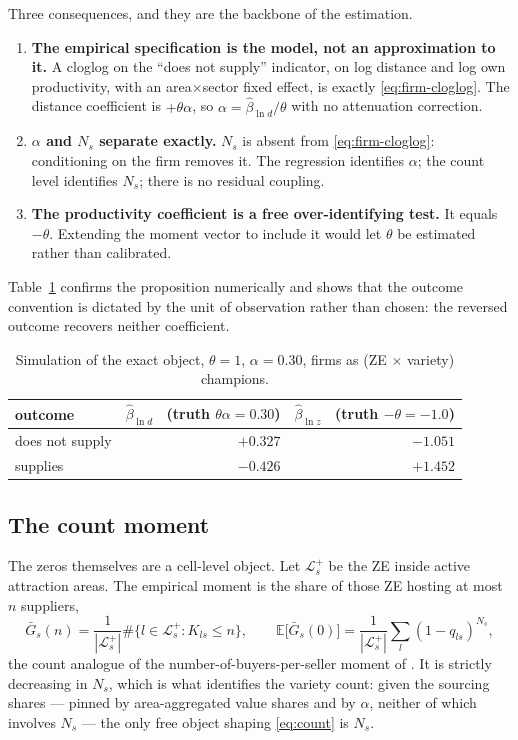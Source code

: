 \documentclass[11pt]{article}
\newcommand{\E}{\mathbb{E}}
\begin{document}
Three consequences, and they are the backbone of the estimation.

\begin{enumerate}[nosep,topsep=3pt,label=(\alph*)]
\item \textbf{The empirical specification is the model, not an approximation to it.} A cloglog on
the ``does not supply'' indicator, on log distance and log own productivity, with an
area$\times$sector fixed effect, is exactly \eqref{eq:firm-cloglog}. The distance coefficient is
$+\theta\alpha$, so $\alpha=\hat\beta_{\ln d}/\theta$ with no attenuation correction.
\item \textbf{$\alpha$ and $N_{s}$ separate exactly.} $N_{s}$ is absent from
\eqref{eq:firm-cloglog}: conditioning on the firm removes it. The regression identifies $\alpha$;
the count level identifies $N_{s}$; there is no residual coupling.
\item \textbf{The productivity coefficient is a free over-identifying test.} It equals $-\theta$.
Extending the moment vector to include it would let $\theta$ be estimated rather than calibrated.
\end{enumerate}

Table~\ref{tab:convention} confirms the proposition numerically and shows that the outcome
convention is dictated by the unit of observation rather than chosen: the reversed outcome
recovers neither coefficient.

\begin{table}[htbp]
\centering
\small
\begin{tabular}{@{}lrr@{}}
\toprule
outcome & $\hat\beta_{\ln d}$ \ (truth $\theta\alpha=0.30$) & $\hat\beta_{\ln z}$ \ (truth $-\theta=-1.0$)\\
\midrule
does not supply & $+0.327$ & $-1.051$\\
supplies        & $-0.426$ & $+1.452$\\
\bottomrule
\end{tabular}
\caption{Simulation of the exact object, $\theta=1$, $\alpha=0.30$, firms as (ZE $\times$ variety)
champions.}
\label{tab:convention}
\end{table}

\subsection{The count moment}
\label{sec:count}

The zeros themselves are a cell-level object. Let $\mathcal{L}^{+}_{s}$ be the ZE inside active
attraction areas. The empirical moment is the share of those ZE hosting at most $n$ suppliers,
\begin{equation}
\bar G_{s}(n)=\frac{1}{|\mathcal{L}^{+}_{s}|}\#\big\{l\in\mathcal{L}^{+}_{s}:K_{ls}\le n\big\},
\qquad
\E\big[\bar G_{s}(0)\big]=\frac{1}{|\mathcal{L}^{+}_{s}|}\sum_{l}(1-q_{ls})^{N_{s}},
\label{eq:count}
\end{equation}
the count analogue of the number-of-buyers-per-seller moment of \citet{lmm2023}. It is strictly
decreasing in $N_{s}$, which is what identifies the variety count: given the sourcing shares ---
pinned by area-aggregated value shares and by $\alpha$, neither of which involves $N_{s}$ --- the
only free object shaping \eqref{eq:count} is $N_{s}$.
\end{document}
